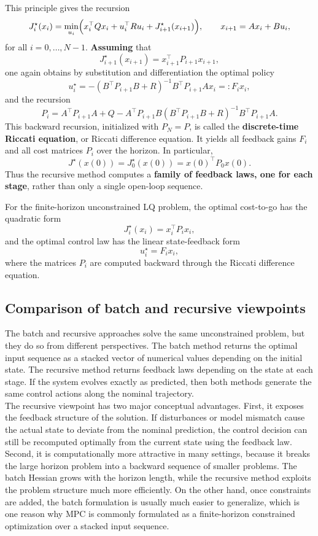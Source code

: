 This principle gives the recursion
\[
J_i^\star(x_i)
=
\min_{u_i}
\Bigl(
x_i^\top Qx_i + u_i^\top Ru_i + J_{i+1}^\star(x_{i+1})
\Bigr),
\qquad
x_{i+1}=Ax_i+Bu_i,
\]
for all $i=0,\dots,N-1$. \textbf{Assuming} that
\[
J_{i+1}^\star(x_{i+1})=x_{i+1}^\top P_{i+1}x_{i+1},
\]
one again obtains by substitution and differentiation the optimal policy
\[
u_i^\star
=
-(B^\top P_{i+1}B + R)^{-1}B^\top P_{i+1}Ax_i
=:F_i x_i,
\]
and the recursion
\[
P_i
=
A^\top P_{i+1}A + Q
-
A^\top P_{i+1}B(B^\top P_{i+1}B + R)^{-1}B^\top P_{i+1}A.
\]
This backward recursion, initialized with $P_N=P$, is called the \textbf{discrete-time Riccati equation}, or Riccati difference equation. It yields all feedback gains $F_i$ and all cost matrices $P_i$ over the horizon. In particular,
\[
J^\star(x(0)) = J_0^\star(x(0)) = x(0)^\top P_0 x(0).
\]
Thus the recursive method computes a \textbf{family of feedback laws, one for each stage}, rather than only a single open-loop sequence.

\begin{theorembox}
For the finite-horizon unconstrained LQ problem, the optimal cost-to-go has the quadratic form
\[
J_i^\star(x_i)=x_i^\top P_i x_i,
\]
and the optimal control law has the linear state-feedback form
\[
u_i^\star = F_i x_i,
\]
where the matrices $P_i$ are computed backward through the Riccati difference equation.
\end{theorembox}

\subsection{Comparison of batch and recursive viewpoints}

The batch and recursive approaches solve the same unconstrained problem, but they do so from different perspectives. The batch method returns the optimal input sequence as a stacked vector of numerical values depending on the initial state. The recursive method returns feedback laws depending on the state at each stage. If the system evolves exactly as predicted, then both methods generate the same control actions along the nominal trajectory.\\

The recursive viewpoint has two major conceptual advantages. First, it exposes the feedback structure of the solution. If disturbances or model mismatch cause the actual state to deviate from the nominal prediction, the control decision can still be recomputed optimally from the current state using the feedback law. Second, it is computationally more attractive in many settings, because it breaks the large horizon problem into a backward sequence of smaller problems. The batch Hessian grows with the horizon length, while the recursive method exploits the problem structure much more efficiently. On the other hand, once constraints are added, the batch formulation is usually much easier to generalize, which is one reason why MPC is commonly formulated as a finite-horizon constrained optimization over a stacked input sequence.

